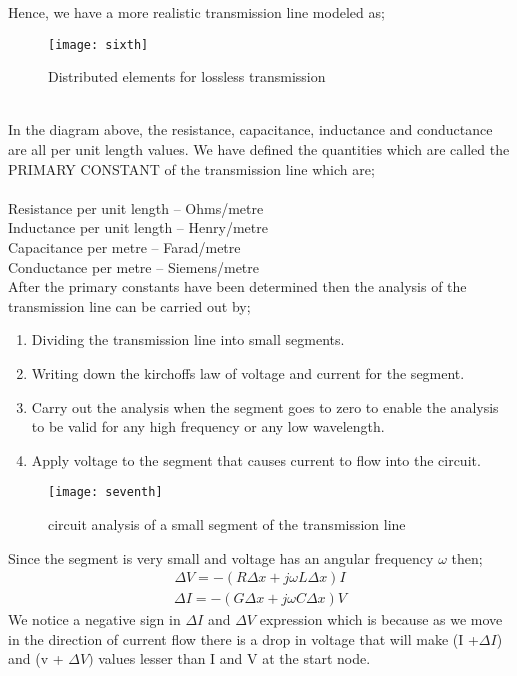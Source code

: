 	Hence, we have a more realistic transmission line modeled as;\\
	\begin{figure}[h]
		\centering
		\texttt{[image: sixth]}
		\caption{Distributed elements for lossless transmission}
	\end{figure}
	\\
	In the diagram above, the resistance, capacitance, inductance and conductance are all per unit length values. We have defined the quantities which are called the PRIMARY CONSTANT of the transmission line which are;
	\\\\
	Resistance per unit length – Ohms/metre
	\\
	Inductance per unit length – Henry/metre  
	\\
	Capacitance per metre – Farad/metre 
	\\
	Conductance per metre – Siemens/metre\\
	
	
	After the primary constants have been determined then the analysis of the transmission line can be carried out by;
	\begin{enumerate}
		\itemsep0em
		\item Dividing the transmission line into small segments.
		\item Writing down the kirchoffs law of voltage and current for the segment.
		\item Carry out the analysis when the segment goes to zero to enable the analysis to be valid for any high frequency or any low wavelength. 
		\item Apply voltage to the segment that causes current to flow into the circuit.
	\end{enumerate}
	\begin{figure}[h]
	\centering
	\texttt{[image: seventh]}
	\caption{circuit analysis of a small segment of the transmission line}
	\end{figure}
	Since the segment is very small and voltage has an angular frequency $ \omega $ then;
	\begin{align}  
	\Delta V = - (R \Delta x + j\omega L\Delta x)I
	\end{align}
	\begin{align}
\Delta I = - (G \Delta x + j \omega C \Delta x)V
	\end{align}
	We notice a negative sign in $ \Delta I $ and $ \Delta V $ expression which is because as we move in the direction of current flow there is a drop in voltage that will make (I +$  \Delta I $) and (v + $ \Delta V) $ values lesser than I and V at the start node.\\
	
